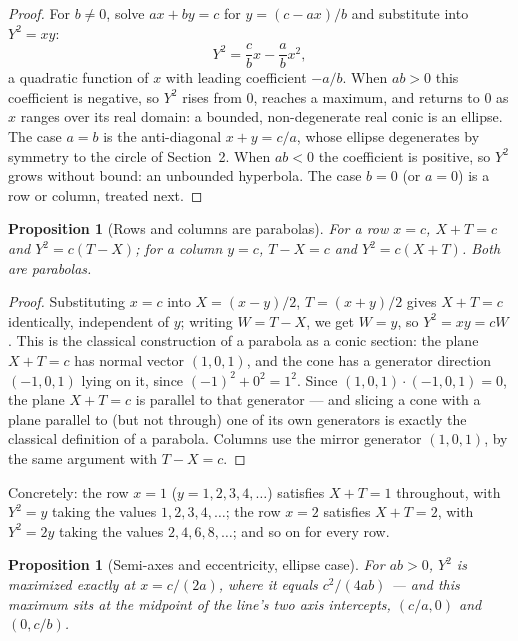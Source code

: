 \documentclass[11pt]{amsart}
\newtheorem{proposition}[theorem]{Proposition}
\theoremstyle{remark}
\begin{document}
\begin{proof}
For $b\ne0$, solve $ax+by=c$ for $y=(c-ax)/b$ and substitute into $Y^2=xy$:
\begin{equation}
Y^2=\frac cb x-\frac ab x^2, \tag{3.1}
\end{equation}
a quadratic function of $x$ with leading coefficient $-a/b$. When $ab>0$ this coefficient is negative, so $Y^2$ rises from $0$, reaches a maximum, and returns to $0$ as $x$ ranges over its real domain: a bounded, non-degenerate real conic is an ellipse. The case $a=b$ is the anti-diagonal $x+y=c/a$, whose ellipse degenerates by symmetry to the circle of Section~2. When $ab<0$ the coefficient is positive, so $Y^2$ grows without bound: an unbounded hyperbola. The case $b=0$ (or $a=0$) is a row or column, treated next.
\end{proof}

\begin{proposition}[Rows and columns are parabolas]
For a row $x=c$, $X+T=c$ and $Y^2=c(T-X)$; for a column $y=c$, $T-X=c$ and $Y^2=c(X+T)$. Both are parabolas.
\end{proposition}

\begin{proof}
Substituting $x=c$ into $X=(x-y)/2$, $T=(x+y)/2$ gives $X+T=c$ identically, independent of $y$; writing $W=T-X$, we get $W=y$, so $Y^2=xy=cW$. This is the classical construction of a parabola as a conic section: the plane $X+T=c$ has normal vector $(1,0,1)$, and the cone has a generator direction $(-1,0,1)$ lying on it, since $(-1)^2+0^2=1^2$. Since $(1,0,1)\cdot(-1,0,1)=0$, the plane $X+T=c$ is parallel to that generator --- and slicing a cone with a plane parallel to (but not through) one of its own generators is exactly the classical definition of a parabola. Columns use the mirror generator $(1,0,1)$, by the same argument with $T-X=c$.
\end{proof}

Concretely: the row $x=1$ ($y=1,2,3,4,\dots$) satisfies $X+T=1$ throughout, with $Y^2=y$ taking the values $1,2,3,4,\dots$; the row $x=2$ satisfies $X+T=2$, with $Y^2=2y$ taking the values $2,4,6,8,\dots$; and so on for every row.

\begin{proposition}[Semi-axes and eccentricity, ellipse case]\label{prop:semiaxes}
For $ab>0$, $Y^2$ is maximized exactly at $x=c/(2a)$, where it equals $c^2/(4ab)$ --- and this maximum sits at the midpoint of the line's two axis intercepts, $(c/a,0)$ and $(0,c/b)$.
\end{proposition}
\end{document}
